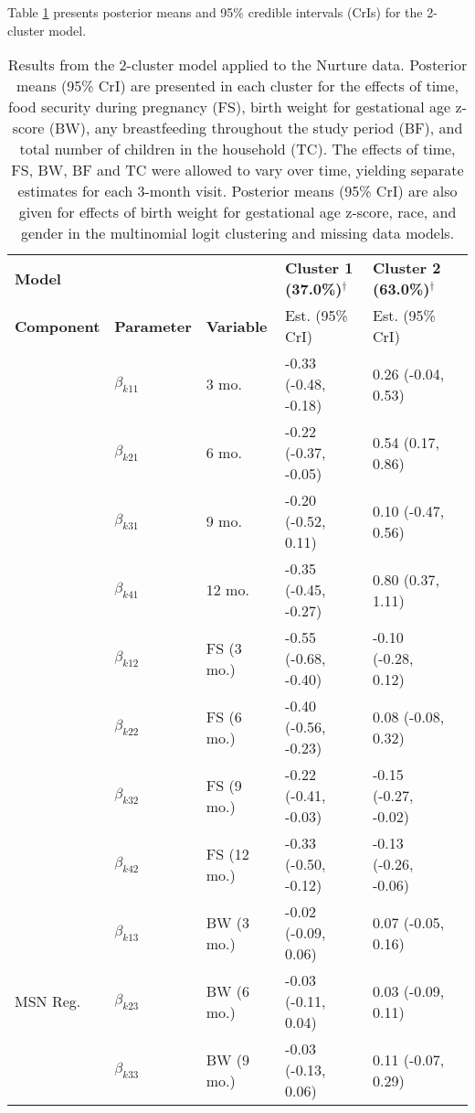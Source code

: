 \documentclass[useAMS,usenatbib,referee]{biom}
\begin{document}
Table \ref{tab:fs_parms} presents posterior means and 95\% credible intervals (CrIs) for the 2-cluster model.
\begin{table}
\begin{center}
\caption{\label{tab:fs_parms} Results from the 2-cluster model applied to the Nurture data. Posterior means (95\% CrI) are presented in each cluster for the effects of time, food security during pregnancy (FS), birth weight for gestational age z-score (BW), any breastfeeding throughout the study period (BF), and total number of children in the household (TC). The effects of time, FS, BW, BF and TC were allowed to vary over time, yielding separate estimates for each 3-month visit. Posterior means (95\% CrI) are also given for effects of birth weight for gestational age z-score, race, and gender in the multinomial logit clustering and missing data models.}
\begin{tabular}{@{}llllll@{}}
\toprule
 \textbf{Model}& & &\textbf{Cluster 1 (37.0\%)$^{\dagger}$} & \textbf{Cluster 2 (63.0\%)$^{\dagger}$} \\
 \textbf{Component} & \textbf{Parameter} &  \textbf{Variable}& Est. (95\% CrI) & Est. (95\% CrI) \\\midrule
 & $\beta_{k11}$ & 3 mo. & -0.33 (-0.48, -0.18) & 0.26 (-0.04, 0.53) \\
 & $\beta_{k21}$& 6 mo. & -0.22 (-0.37, -0.05) & 0.54 (0.17, 0.86) \\
 & $\beta_{k31}$& 9 mo. & -0.20 (-0.52, 0.11) & 0.10 (-0.47, 0.56)\\
 & $\beta_{k41}$&12 mo. & -0.35 (-0.45, -0.27) & 0.80 (0.37, 1.11) \\
 & $\beta_{k12}$&FS (3 mo.) & -0.55 (-0.68, -0.40) & -0.10 (-0.28, 0.12) \\
 & $\beta_{k22}$&FS (6 mo.) & -0.40 (-0.56, -0.23) & 0.08 (-0.08, 0.32) \\
 & $\beta_{k32}$&FS (9 mo.) & -0.22 (-0.41, -0.03) & -0.15 (-0.27, -0.02) \\
 & $\beta_{k42}$&FS (12 mo.)& -0.33 (-0.50, -0.12) & -0.13 (-0.26, -0.06) \\
 & $\beta_{k13}$&BW (3 mo.) & -0.02 (-0.09, 0.06) & 0.07 (-0.05, 0.16) \\
 MSN Reg. & $\beta_{k23}$& BW (6 mo.) & -0.03 (-0.11, 0.04) & 0.03 (-0.09, 0.11)\\
 & $\beta_{k33}$&BW (9 mo.) & -0.03 (-0.13, 0.06) & 0.11 (-0.07, 0.29) \\

\end{tabular}
\end{center}
\end{table}
\end{document}
